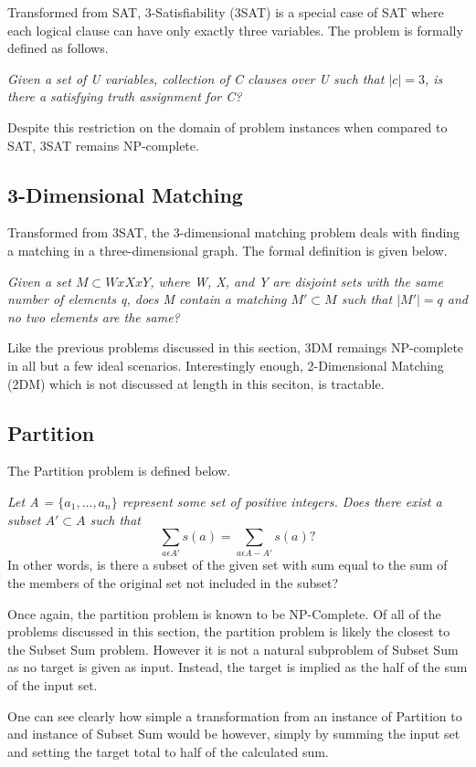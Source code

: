 \documentclass{report}
\begin{document}
Transformed from SAT, 3-Satisfiability (3SAT) is a special case of SAT where each logical 
clause can have only exactly three variables. The problem is formally defined as follows.

\textit{Given a set of U variables, collection of C clauses over U such that $|c| = 3$, is there a satisfying truth assignment for C?}

Despite this restriction on the domain of problem instances when compared to SAT, 
3SAT remains NP-complete.

\subsection{3-Dimensional Matching} 

Transformed from 3SAT, the 3-dimensional matching problem deals with finding a matching in 
a three-dimensional graph. The formal definition is given below.

\textit{Given a set $M \subset WxXxY$, where W, X, and Y are disjoint sets with the same number of elements q, does M contain a matching $M' \subset M$ such that $|M'|= q$ and no two elements are the same?}

Like the previous problems discussed in this section, 3DM remaings NP-complete in all but a few ideal scenarios.
Interestingly enough, 2-Dimensional Matching (2DM) which is not discussed at length in this seciton, is tractable.

\subsection{Partition} 

The Partition problem is defined below.

\textit{Let A = $\{a_1, ..., a_n\}$ represent some set of positive integers. Does there exist a subset $A' \subset A$ such that
  $$\sum_{a \epsilon A'} s(a) = \sum_{a \epsilon A - A'} s(a)?$$}
In other words, is there a subset of the given set with sum equal to the sum of the members of the original set not included in the subset?

Once again, the partition problem is known to be NP-Complete. Of all of the problems discussed in this section,
the partition problem is likely the closest to the Subset Sum problem. However it is not a natural subproblem of Subset Sum
as no target is given as input. Instead, the target is implied as the half of the sum of the input set.

One can see clearly how simple a transformation from an instance of Partition to and instance of Subset Sum would be however, simply
by summing the input set and setting the target total to half of the calculated sum.
\end{document}
